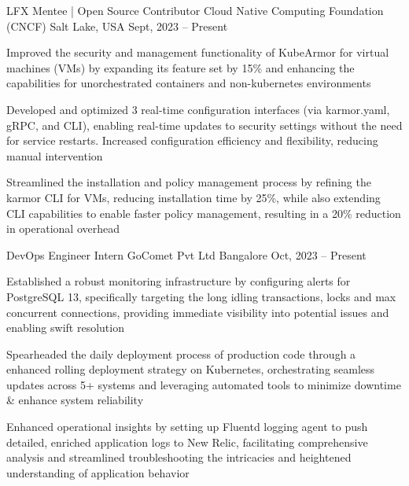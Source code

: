 \documentclass[]{awesome-cv}
\begin{document}
\vspace{-3mm}
\begin{cventries}
    \vspace{-1mm}
    \cventry
    {LFX Mentee | Open Source Contributor}
    {Cloud Native Computing Foundation (CNCF)}
    {Salt Lake, USA}
    {Sept, 2023 – Present}
    {\begin{cvitems}
        \item Improved the security and management functionality of KubeArmor for virtual machines (VMs) by expanding its feature set by 15\% and enhancing the capabilities for unorchestrated containers and non-kubernetes environments
        \item Developed and optimized 3 real-time configuration interfaces (via karmor.yaml, gRPC, and CLI), enabling real-time updates to security settings without the need for service restarts. Increased configuration efficiency and flexibility, reducing manual intervention
        \item Streamlined the installation and policy management process by refining the karmor CLI for VMs, reducing installation time by 25\%, while also extending CLI capabilities to enable faster policy management, resulting in a 20\% reduction in operational overhead
        \end{cvitems}}
    \cventry
    {DevOps Engineer Intern}
    {GoComet Pvt Ltd}
    {Bangalore}
    {Oct, 2023 – Present}
    {\begin{cvitems}
            \item {Established a robust monitoring infrastructure by configuring alerts for PostgreSQL 13, specifically targeting the long idling transactions, locks and max concurrent connections, providing immediate visibility into potential issues and enabling swift resolution}
            \item {Spearheaded the daily deployment process of production code through a enhanced rolling deployment strategy on Kubernetes, orchestrating seamless updates across 5+ systems and leveraging automated tools to minimize downtime \& enhance system reliability}
            \item {Enhanced operational insights by setting up Fluentd logging agent to push detailed, enriched application logs to New Relic, facilitating comprehensive analysis and streamlined troubleshooting the intricacies and heightened understanding of application behavior}

\end{cvitems}}
\end{cventries}
\end{document}
